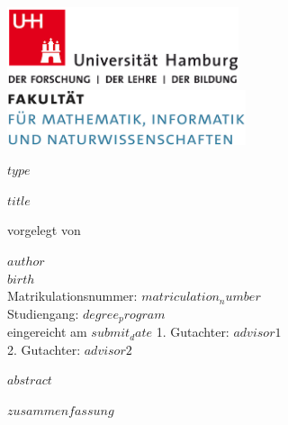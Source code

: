 \documentclass[a4paper,12pt]{article}
\begin{document}
\thispagestyle{empty}

\begin{titlepage}

\includegraphics[width=6.8cm]{images/uhh_logo.png}
\hspace{2cm}
\includegraphics[width=7cm]{images/min_logo.png}

\begin{center}\Large
  \vfill
	$type$
	\vfill
	\makeatletter
	{\LARGE\textsf{\textbf{$title$}}\par}
	\makeatother
	\vfill
  vorgelegt von \\\vspace{0.5cm}
  \par\bigskip
	\makeatletter
  \textbf{$author$} \\
  \makeatother
  $birth$ \\
  Matrikulationsnummer: $matriculation_number$ \\
  Studiengang: $degree_program$ \\
  \vfill
	\makeatletter
	eingereicht am $submit_date$
	\makeatother
	\vfill
  1. Gutachter: $advisor1$ \\
  2. Gutachter: $advisor2$ \\

\end{center}
\end{titlepage}


\newpage
$abstract$
\pagestyle{plain}
\setcounter{page}{1}    		%

\newpage
$zusammenfassung$

\newpage
\renewcommand{\contentsname}{Inhaltsverzeichnis}
\tableofcontents
\clearpage
\end{document}
